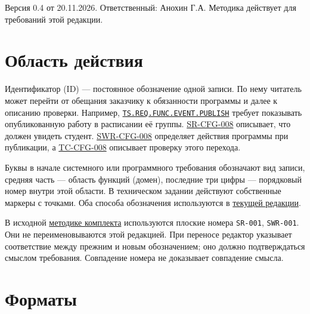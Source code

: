 \documentclass[12pt,a4paper]{article}
\begin{document}
Версия 0.4 от 20.11.2026. Ответственный: Анохин Г.А. Методика действует для требований этой редакции.

\section{Область действия}\label{ux43eux431ux43bux430ux441ux442ux44c-ux434ux435ux439ux441ux442ux432ux438ux44f}

\hypertarget{область-действия}{}

Идентификатор (ID) --- постоянное обозначение одной записи. По нему читатель может перейти от обещания заказчику к обязанности программы и далее к описанию проверки. Например, {\href{../../02\_Техническое\_задание/Техническое\_задание.pdf\#ts-req-func-event-publish}{\texttt{TS.\allowbreak{}REQ.\allowbreak{}FUNC.\allowbreak{}EVENT.\allowbreak{}PUBLISH}}} требует показывать опубликованную работу в расписании её группы. {\href{../../04\_Системные\_требования/DOC-05\_Системные\_требования.pdf\#sr-cfg-008}{SR-CFG-008}} описывает, что должен увидеть студент. {\href{../../07\_Программные\_требования/DOC-06\_Программные\_требования.pdf\#swr-cfg-008}{SWR-CFG-008}} определяет действия программы при публикации, а {\href{../../10\_Верификация\_и\_тестирование/DOC-10\_План\_верификации.pdf\#tc-cfg-008}{TC-CFG-008}} описывает проверку этого перехода.

Буквы в начале системного или программного требования обозначают вид записи, средняя часть --- область функций (домен), последние три цифры --- порядковый номер внутри этой области. В техническом задании действуют собственные маркеры с точками. Оба способа обозначения используются в \href{https://github.com/Kokorev-VD/mephi-samolety/blob/main/docs/README.md}{текущей редакции}.

В исходной \href{https://github.com/Kokorev-VD/mephi-samolety/blob/main/notes/methodology/id-methodology.md}{методике комплекта} используются плоские номера \texttt{SR-001}, \texttt{SWR-001}. Они не переименовываются этой редакцией. При переносе редактор указывает соответствие между прежним и новым обозначением; оно должно подтверждаться смыслом требования. Совпадение номера не доказывает совпадение смысла.

\section{Форматы}\label{ux444ux43eux440ux43cux430ux442ux44b}

\hypertarget{форматы}{}
\end{document}
